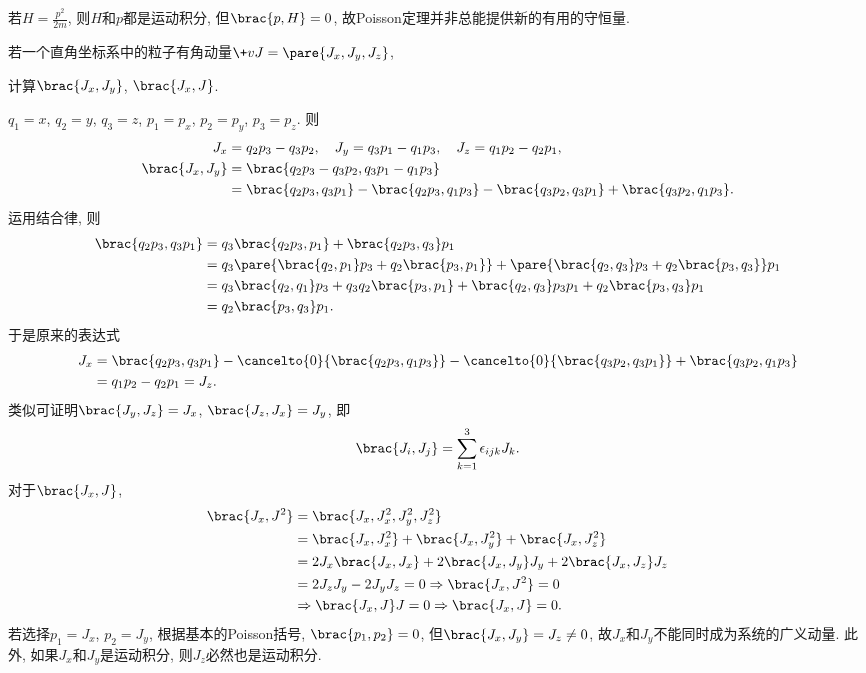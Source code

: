 \documentclass[../LectureNotes.tex]{subfiles}
\begin{document}
\begin{ex}
    若$\displaystyle H = \frac{p^2}{2m}$, 则$H$和$p$都是运动积分, 但$\brac{p,H} = 0$, 故Poisson定理并非总能提供新的有用的守恒量.
\end{ex}
\begin{sample}
    \begin{ex}
        若一个直角坐标系中的粒子有角动量$\+vJ = \pare{J_x,J_y,J_z}$,
        \begin{cenum}
            \item 计算$\brac{J_x,J_y}$, $\brac{J_x,J}$.
        \end{cenum}
    \end{ex}
    \begin{solution}
        $q_1 = x$, $q_2 = y$, $q_3 = z$, $p_1 = p_x$, $p_2 = p_y$, $p_3 = p_z$. 则
        \begin{align*}
            J_x &= q_2p_3 - q_3p_2,\quad J_y = q_3p_1 - q_1p_3,\quad J_z = q_1p_2 - q_2 p_1, \\
            \brac{J_x,J_y} &= \brac{q_2p_3 - q_3p_2, q_3p_1 - q_1p_3} \\
            &= \brac{q_2p_3,q_3p_1} - \brac{q_2p_3,q_1p_3} - \brac{q_3p_2,q_3p_1} + \brac{q_3p_2,q_1p_3}.
        \end{align*}
        运用结合律, 则
        \begin{align*}
            \brac{q_2p_3,q_3p_1} &= q_3\brac{q_2p_3,p_1} + \brac{q_2p_3,q_3}p_1 \\
            &= q_3\pare{\brac{q_2,p_1}p_3 + q_2\brac{p_3,p_1}} + \pare{\brac{q_2,q_3}p_3 + q_2\brac{p_3,q_3}}p_1 \\
            &= q_3\brac{q_2,q_1}p_3 + q_3q_2\brac{p_3,p_1} + \brac{q_2,q_3}p_3p_1 + q_2\brac{p_3,q_3}p_1 \\
            &= q_2\brac{p_3,q_3}p_1.
        \end{align*}
        于是原来的表达式
        \begin{align*}
            J_x &= {\brac{q_2p_3,q_3p_1}} - \cancelto{0}{\brac{q_2p_3,q_1p_3}} - \cancelto{0}{\brac{q_3p_2,q_3p_1}} + {\brac{q_3p_2,q_1p_3}} \\
            &= q_1p_2 - q_2p_1 = J_z.
        \end{align*}
        类似可证明$\brac{J_y,J_z} = J_x$, $\brac{J_z,J_x} = J_y$, 即
        \[ \brac{J_i,J_j} = \sum_{k=1}^3 \epsilon_{ijk}J_k. \]
        对于$\brac{J_x,J}$,
        \begin{align*}
            \brac{J_x,J^2} &= \brac{J_x,J_x^2,J_y^2,J_z^2} \\
            &= \brac{J_x,J_x^2} + \brac{J_x,J_y^2} + \brac{J_x,J_z^2} \\
            &= 2J_x\brac{J_x,J_x} + 2\brac{J_x,J_y}J_y + 2\brac{J_x,J_z}J_z \\
            &= 2J_zJ_y - 2J_yJ_z = 0 \Rightarrow \brac{J_x,J^2} = 0 \\ &\Rightarrow \brac{J_x,J}J = 0\Rightarrow \brac{J_x,J} = 0.
        \end{align*}
        若选择$p_1=J_x$, $p_2=J_y$, 根据基本的Poisson括号, $\brac{p_1,p_2} = 0$, 但$\brac{J_x,J_y} = J_z\neq 0$, 故$J_x$和$J_y$不能同时成为系统的广义动量. 此外, 如果$J_x$和$J_y$是运动积分, 则$J_z$必然也是运动积分.
    \end{solution}
\end{sample}
\end{document}
